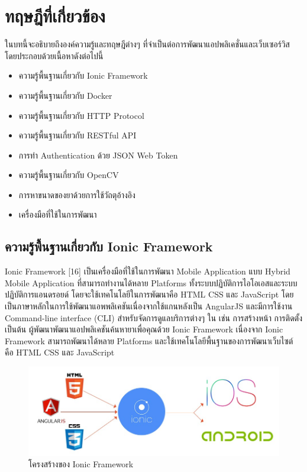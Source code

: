 \chapter{ทฤษฎีที่เกี่ยวข้อง}
ในบทนี้จะอธิบายถึงองค์ความรู้และทฤษฎีต่างๆ ที่จำเป็นต่อการพัฒนาแอปพลิเคชั่นและเว็บเซอร์วิส โดยประกอบด้วยเนื้อหาดังต่อไปนี้
\begin{itemize}[label={--}]
	\item ความรู้พื้นฐานเกี่ยวกับ Ionic Framework
	\item ความรู้พื้นฐานเกี่ยวกับ Docker
	\item ความรู้พื้นฐานเกี่ยวกับ HTTP Protocol
	\item ความรู้พื้นฐานเกี่ยวกับ RESTful API
	\item การทำ Authentication ด้วย JSON Web Token
	\item ความรู้พื้นฐานเกี่ยวกับ OpenCV
	\item การหาขนาดของยาด้วยการใช้วัถตุอ้างอิง
	\item เครื่องมือที่ใช้ในการพัฒนา
\end{itemize}

\section{ความรู้พื้นฐานเกี่ยวกับ Ionic Framework}
	Ionic Framework [16] เป็นเครื่องมือที่ใช้ในการพัฒนา Mobile Application แบบ Hybrid Mobile Application ที่สามารถทำงานได้หลาย Platforms ทั้งระบบปฏิบัติการไอโอเอสและระบบปฏิบัติการแอนดรอยด์ โดยจะใช้เทคโนโลยีในการพัฒนาคือ HTML CSS และ JavaScript โดยเป็นภาษาหลักในการใช้พัฒนาแอพพลิเคชันเนื่องจากใช้แกนหลังเป็น AngularJS และมีการใช้งาน Command-line interface (CLI) สำหรับจัดการดูแลบริการต่างๆ ใน เช่น การสร้างหน้า การติดตั้ง เป็นต้น ผู้พัฒนาพัฒนาแอปพลิเคชันค้นหายาเพื่อคุณด้วย Ionic Framework เนื่องจาก Ionic Framework สามารถพัฒนาได้หลาย Platforms และใช้เทคโนโลยีพื้นฐานของการพัฒนาเว็บไซต์ คือ HTML CSS และ JavaScript 

	\begin{figure}[H]
		\includegraphics[width=\columnwidth]{Figures/2/ionic-structure}
		\caption{โครงสร้างของ Ionic Framework}
		\label{Fig:ionic-structure}
	\end{figure}
	
